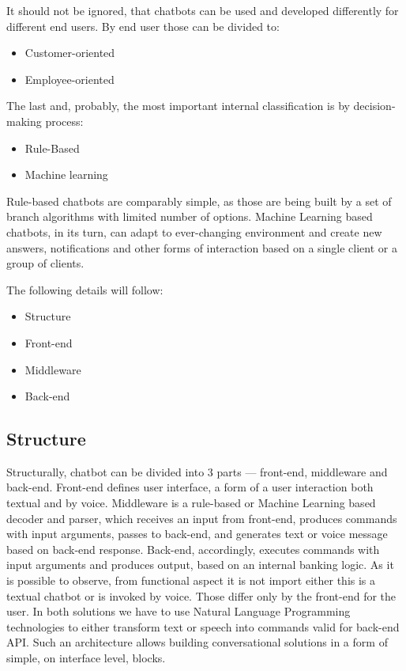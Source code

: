 It should not be ignored, that chatbots can be used and developed differently for different end users.
By end user those can be divided to:
\begin{itemize}
    \item Customer-oriented
    \item Employee-oriented
\end{itemize}

The last and, probably, the most important internal classification is by decision-making process:
\begin{itemize}
    \item Rule-Based
    \item Machine learning
\end{itemize}

Rule-based chatbots are comparably simple, as those are being built by a set of branch algorithms with limited number of options.
Machine Learning based chatbots, in its turn, can adapt to ever-changing environment and create new answers, notifications and other forms of interaction based on a single client or a group of clients.

\bigskip
\noindent The following details will follow: 
\begin{itemize}
    \item Structure 
    \item Front-end 
    \item Middleware 
    \item Back-end 
\end{itemize}


\subsection*{Structure}

Structurally, chatbot can be divided into 3 parts — front-end, middleware and back-end.
Front-end defines user interface, a form of a user interaction both textual and by voice.
Middleware is a rule-based or Machine Learning based decoder and parser, which receives an input from front-end, produces commands with input arguments, passes to back-end, and generates text or voice message based on back-end response.
Back-end, accordingly, executes commands with input arguments and produces output, based on an internal banking logic.
As it is possible to observe, from functional aspect it is not import either this is a textual chatbot or is invoked by voice.
Those differ only by the front-end for the user.
In both solutions we have to use Natural Language Programming technologies to either transform text or speech into commands valid for back-end API.
Such an architecture allows building conversational solutions in a form of simple, on interface level, blocks.

